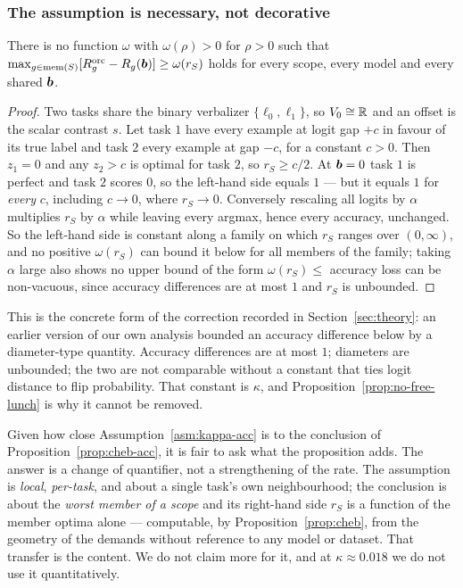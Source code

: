 \subsubsection{The assumption is necessary, not decorative}
\label{app:kappa-necessary}

\begin{proposition}
\label{prop:no-free-lunch}
There is no function $\omega$ with $\omega(\rho)>0$ for $\rho>0$ such that
$\max_{g\in\mathrm{mem}(S)}[R_g^{\mathrm{orc}}-R_g(\bm{b})]\ge\omega(r_S)$ holds for
every scope, every model and every shared $\bm{b}$.
\end{proposition}

\begin{proof}
Two tasks share the binary verbalizer $\{\ell_0,\ell_1\}$, so $V_0\cong\mathbb{R}$ and an
offset is the scalar contrast $s$. Let task $1$ have every example at logit gap
$+c$ in favour of its true label and task $2$ every example at gap $-c$, for a
constant $c>0$. Then $z_1=0$ and any $z_2>c$ is optimal for task $2$, so
$r_S\ge c/2$. At $\bm{b}=0$ task $1$ is perfect and task $2$ scores $0$, so the
left-hand side equals $1$ --- but it equals $1$ for \emph{every} $c$, including
$c\to0$, where $r_S\to0$. Conversely rescaling all logits by $\alpha$ multiplies
$r_S$ by $\alpha$ while leaving every argmax, hence every accuracy, unchanged. So
the left-hand side is constant along a family on which $r_S$ ranges over
$(0,\infty)$, and no positive $\omega(r_S)$ can bound it below for all members of
the family; taking $\alpha$ large also shows no upper bound of the form
$\omega(r_S)\le$ accuracy loss can be non-vacuous, since accuracy differences are
at most $1$ and $r_S$ is unbounded.
\end{proof}

\noindent This is the concrete form of the correction recorded in
Section~\ref{sec:theory}: an earlier version of our own analysis bounded an
accuracy difference below by a diameter-type quantity. Accuracy differences are at
most $1$; diameters are unbounded; the two are not comparable without a constant
that ties logit distance to flip probability. That constant is $\kappa$, and
Proposition~\ref{prop:no-free-lunch} is why it cannot be removed.

\begin{remark}
Given how close Assumption~\ref{asm:kappa-acc} is to the conclusion of
Proposition~\ref{prop:cheb-acc}, it is fair to ask what the proposition adds. The
answer is a change of quantifier, not a strengthening of the rate. The assumption
is \emph{local}, \emph{per-task}, and about a single task's own neighbourhood; the
conclusion is about the \emph{worst member of a scope} and its right-hand side
$r_S$ is a function of the member optima alone --- computable, by
Proposition~\ref{prop:cheb}, from the geometry of the demands without reference to
any model or dataset. That transfer is the content. We do not claim more for it,
and at $\kappa\approx0.018$ we do not use it quantitatively.
\end{remark}

